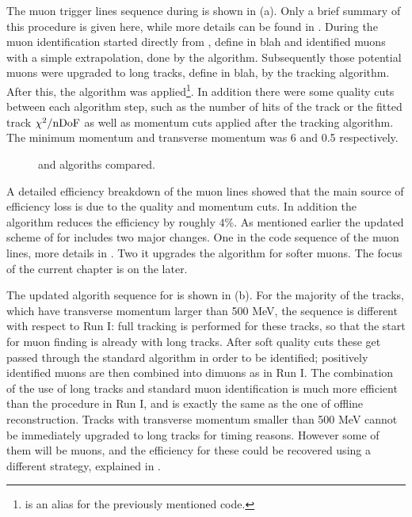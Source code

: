 The \hltone muon trigger lines sequence during \runone is shown in (a).
Only a brief summary of this procedure is given here,  while more details can be found in \cite{LHCb-PUB-2011-017}.
During \runone the muon identification started directly from \veloTracks,{\color{red} define in blah}
and identified muons with a simple extrapolation, done by the \mvm algorithm\cite{LHCb-PUB-2011-017}.
Subsequently those potential muons were upgraded to long tracks, {\color{red} define in blah}, by the
\FwD tracking algorithm. After this, the \isMuon algorithm was applied\footnote{\isMuon is an alias for the previously mentioned \muonID code.}.
In addition there were some quality cuts between each algorithm step, such as the number of \velo hits
of the track or the fitted track $\chi^2/{\rm nDoF}$ as well as momentum cuts applied after the \FwD
tracking algorithm. The minimum momentum and transverse momentum was 6 \gevc and 0.5 \gevc respectively.

\begin{figure}[h!]
  \centering
  \scalebox{1}{}
  \scalebox{1}{}
 \caption{ \runone and \runtwo \hltone algoriths compared. }
  \label{hlt1_algo_seq}
\end{figure}

A detailed efficiency breakdown \cite{kevinThesis} of the \runone \hltone muon lines showed that the main source of efficiency
loss is due to the quality and momentum cuts. In addition the \mvm algorithm reduces the efficiency by roughly $4\%$.
As mentioned earlier the updated scheme of \hltone for \runtwo includes two major changes. One in the code sequence of the
\hltone muon lines, more details in \cite{kevinThesis}. Two it upgrades the \mvm algorithm for softer muons. The focus of the current chapter is on the later.

The updated \hltone algorith sequence for \runtwo is shown in (b).
For the majority of the tracks, which have transverse momentum larger than 500 MeV, the sequence is different with respect to
Run I: full tracking is performed for these tracks, so that the start for muon finding is already with long tracks.
After soft quality cuts these get passed through the standard \isMuon algorithm in order to be identified;
positively identified muons are then combined into dimuons as in Run I.
The combination of the use of long tracks and standard muon identification is much more efficient than the
procedure in Run I, and is exactly the same as the one of offline reconstruction.
Tracks with transverse momentum smaller than 500 MeV cannot be immediately upgraded to long tracks for timing reasons.
However some of them will be muons, and the efficiency for these could be recovered using a different strategy,
explained in .
